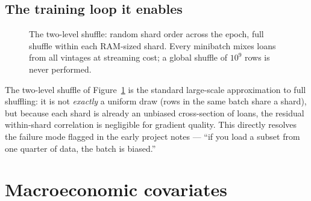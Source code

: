 \documentclass[11pt,a4paper]{article}
\begin{document}
\subsection{The training loop it enables}

\begin{figure}[h]
\centering
{}
\caption{The two-level shuffle: random shard order across the epoch, full shuffle within each RAM-sized shard. Every minibatch mixes loans from all vintages at streaming cost; a global shuffle of $10^9$ rows is never performed.}
\label{fig:shardloop}
\end{figure}

The two-level shuffle of Figure~\ref{fig:shardloop} is the standard large-scale approximation to full shuffling: it is not \emph{exactly} a uniform draw (rows in the same batch share a shard), but because each shard is already an unbiased cross-section of loans, the residual within-shard correlation is negligible for gradient quality. This directly resolves the failure mode flagged in the early project notes --- ``if you load a subset from one quarter of data, the batch is biased.''

\section{Macroeconomic covariates}\label{sec:macro}
\end{document}
